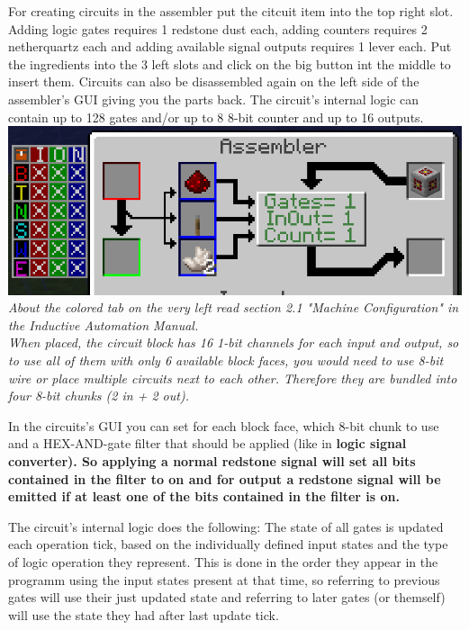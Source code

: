 \documentclass[11pt]{article} %
\begin{document}
For creating circuits in the assembler put the citcuit item into the top right slot. Adding logic gates requires 1 redstone dust each, adding counters requires 2 netherquartz each and adding available signal outputs requires 1 lever each. Put the ingredients into the 3 left slots and click on the big button int the middle to insert them. Circuits can also be disassembled again on the left side of the assembler's GUI giving you the parts back. The circuit's internal logic can contain up to 128 gates and/or up to 8 8-bit counter and up to 16 outputs.\\
\includegraphics[width = \textwidth]{assembler_gui}\\
\it About the colored tab on the very left read section 2.1 "Machine Configuration" in the Inductive Automation Manual. \rm\\

When placed, the circuit block has 16 1-bit channels for each input and output, so to use all of them with only 6 available block faces, you would need to use 8-bit wire or place multiple circuits next to each other. Therefore they are bundled into four 8-bit chunks (2 in + 2 out).

In the circuits's GUI you can set for each block face, which 8-bit chunk to use and a HEX-AND-gate filter that should be applied (like in \bf logic signal converter\rm ). So applying a normal redstone signal will set all bits contained in the filter to on and for output a redstone signal will be emitted if at least one of the bits contained in the filter is on.

The circuit's internal logic does the following:
The state of all gates is updated each operation tick, based on the individually defined input states and the type of logic operation they represent. This is done in the order they appear in the programm using the input states present at that time, so referring to previous gates will use their just updated state and referring to later gates (or themself) will use the state they had after last update tick.
\end{document}
